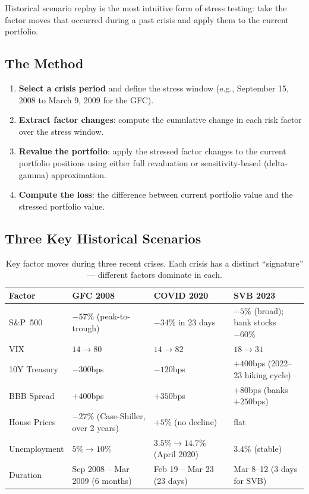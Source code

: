 \documentclass[11pt, a4paper]{article}
\theoremstyle{definition}
\theoremstyle{plain}
\theoremstyle{remark}
\begin{document}
Historical scenario replay is the most intuitive form of stress testing:
take the factor moves that occurred during a past crisis and apply them to the current portfolio.

\subsection{The Method}

\begin{enumerate}
    \item \textbf{Select a crisis period} and define the stress window
          (e.g., September 15, 2008 to March 9, 2009 for the GFC).
    \item \textbf{Extract factor changes}: compute the cumulative change in each risk factor
          over the stress window.
    \item \textbf{Revalue the portfolio}: apply the stressed factor changes
          to the current portfolio positions using either full revaluation
          or sensitivity-based (delta-gamma) approximation.
    \item \textbf{Compute the loss}: the difference between current portfolio value
          and the stressed portfolio value.
\end{enumerate}

\subsection{Three Key Historical Scenarios}

\begin{table}[H]
\centering
\begin{tabular}{@{}lp{2.5cm}p{2.5cm}p{2.5cm}@{}}
\toprule
\textbf{Factor} & \textbf{GFC 2008} & \textbf{COVID 2020} & \textbf{SVB 2023} \\
\midrule
S\&P~500 & $-57\%$ (peak-to-trough) & $-34\%$ in 23 days & $-5\%$ (broad); bank stocks $-60\%$ \\
VIX & $14 \to 80$ & $14 \to 82$ & $18 \to 31$ \\
10Y Treasury & $-300$bps & $-120$bps & $+400$bps (2022--23 hiking cycle) \\
BBB Spread & $+400$bps & $+350$bps & $+80$bps (banks $+250$bps) \\
House Prices & $-27\%$ (Case-Shiller, over 2 years) & $+5\%$ (no decline) & flat \\
Unemployment & $5\% \to 10\%$ & $3.5\% \to 14.7\%$ (April 2020) & $3.4\%$ (stable) \\
Duration & Sep 2008 -- Mar 2009 (6 months) & Feb 19 -- Mar 23 (23 days) & Mar 8--12 (3 days for SVB) \\
\bottomrule
\end{tabular}
\caption{Key factor moves during three recent crises.
Each crisis has a distinct ``signature'' --- different factors dominate in each.}
\end{table}
\end{document}
